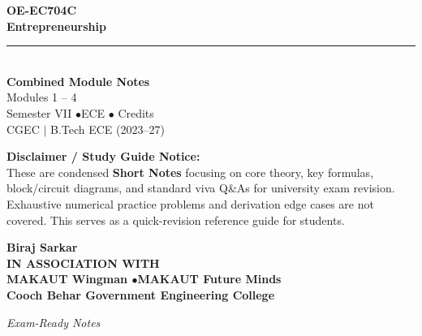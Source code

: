 \documentclass[12pt,a4paper]{article}
\begin{document}
\thispagestyle{empty}


\vspace*{1.0cm}
\begin{center}
  {\Huge\bfseries\color{myred} OE-EC704C}\\[10pt]
  {\LARGE\bfseries\color{mydark} Entrepreneurship}\\[20pt]
  {\color{myred}\rule{0.7\linewidth}{1.5pt}}\\[18pt]
  {\Large\color{myteal}\textbf{Combined Module Notes}}\\[8pt]
  {\large\color{mydark} Modules 1 -- 4}\\[40pt]
  {\normalsize\color{mydark} Semester VII \quad$\bullet$\quad ECE \quad$\bullet$ Credits}\\[12pt]
  {\normalsize\color{mydark} CGEC \;$|$\; B.Tech ECE (2023--27)}
\end{center}
\vspace{1.0cm}
\begin{center}
  \begin{tcolorbox}[colback=mygray, colframe=mgframe, boxrule=0.5pt, arc=3pt, width=0.85\linewidth]
    \centering\small\color{mydark}
    \textbf{Disclaimer / Study Guide Notice:}\\
    These are condensed \textbf{Short Notes} focusing on core theory, key formulas, block/circuit diagrams, and standard viva Q\&As for university exam revision. Exhaustive numerical practice problems and derivation edge cases are not covered. This serves as a quick-revision reference guide for students.
  \end{tcolorbox}
\end{center}
\vfill
\vspace{0.6cm}
\begin{center}
  {\large\bfseries\color{mypurple} Biraj Sarkar}\\[16pt]
  {\footnotesize\color{watermark}\textbf{IN ASSOCIATION WITH}}\\[8pt]
  {\small\bfseries\color{mydark} MAKAUT Wingman \quad$\bullet$\quad MAKAUT Future Minds}\\[12pt]
  {\large\bfseries\color{myteal} Cooch Behar Government Engineering College}
\end{center}
\vfill
\begin{center}{\small\color{watermark}\textit{Exam-Ready Notes}}\end{center}
\clearpage
\end{document}
